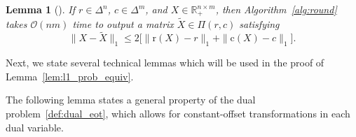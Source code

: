 \documentclass[10pt]{article}
\newcommand{\R}{\mathbb{R}}
\newcommand{\Rp}{\R_{+}}
\newcommand{\coup}{\Pi}
\theoremstyle{plain}
\newtheorem{lemma}[theorem]{Lemma}
\theoremstyle{definition}
\theoremstyle{remark}
\newcommand{\col}{\bm{\mathrm{c}}}
\newcommand{\row}{\bm{\mathrm{r}}}
\begin{document}
\begin{lemma}[{\cite[Lemma 7]{altschulerNearlinearTimeApproximation2017}}]\label{lem:jason_rounding}
    If $r\in\Delta^n$, $c\in\Delta^m$, and $X\in\Rp^{n\times m}$, then Algorithm~\ref{alg:round} takes $\mathcal{O}(nm)$ time to output a matrix $\tilde X\in \coup(r,c)$ satisfying
    \begin{equation}\label{ineq:l1_normbound_jason}
        \|X-\tilde X\|_1\leq 2\bigl[\|\row(X)-r\|_1+\|\col(X)-c\|_1\bigr].
    \end{equation}
\end{lemma}

Next, we state several technical lemmas which will be used in the proof of Lemma~\ref{lem:l1_prob_equiv}.

The following lemma states a general property of the dual problem~\eqref{def:dual_eot}, which allows for constant-offset transformations in each dual variable.
\end{document}
